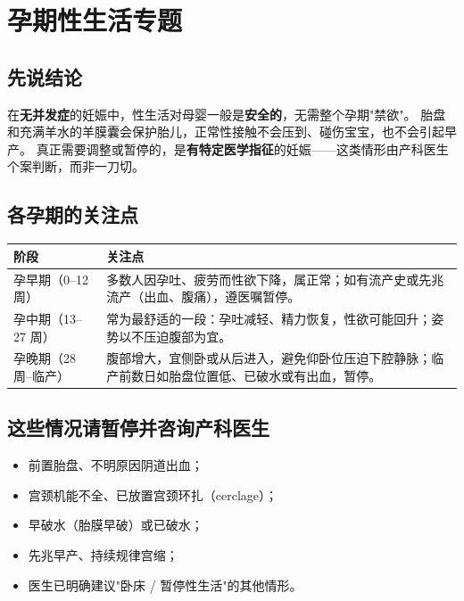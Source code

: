 
\chapter{孕期性生活专题}

\section{先说结论}
在\textbf{无并发症}的妊娠中，性生活对母婴一般是\textbf{安全的}，无需整个孕期"禁欲"。
胎盘和充满羊水的羊膜囊会保护胎儿，正常性接触不会压到、碰伤宝宝，也不会引起早产。
真正需要调整或暂停的，是\textbf{有特定医学指征}的妊娠——这类情形由产科医生个案判断，而非一刀切。

\section{各孕期的关注点}
\begin{tabularx}{\textwidth}{l X}
\toprule
\textbf{阶段} & \textbf{关注点} \\
\midrule
孕早期（0--12 周） & 多数人因孕吐、疲劳而性欲下降，属正常；如有流产史或先兆流产（出血、腹痛），遵医嘱暂停。 \\
孕中期（13--27 周） & 常为最舒适的一段：孕吐减轻、精力恢复，性欲可能回升；姿势以不压迫腹部为宜。 \\
孕晚期（28 周--临产） & 腹部增大，宜侧卧或从后进入，避免仰卧位压迫下腔静脉；临产前数日如胎盘位置低、已破水或有出血，暂停。 \\
\bottomrule
\end{tabularx}

\section{这些情况请暂停并咨询产科医生}
\begin{itemize}
  \item 前置胎盘、不明原因阴道出血；
  \item 宫颈机能不全、已放置宫颈环扎（cerclage）；
  \item 早破水（胎膜早破）或已破水；
  \item 先兆早产、持续规律宫缩；
  \item 医生已明确建议"卧床 / 暂停性生活"的其他情形。
\end{itemize}

